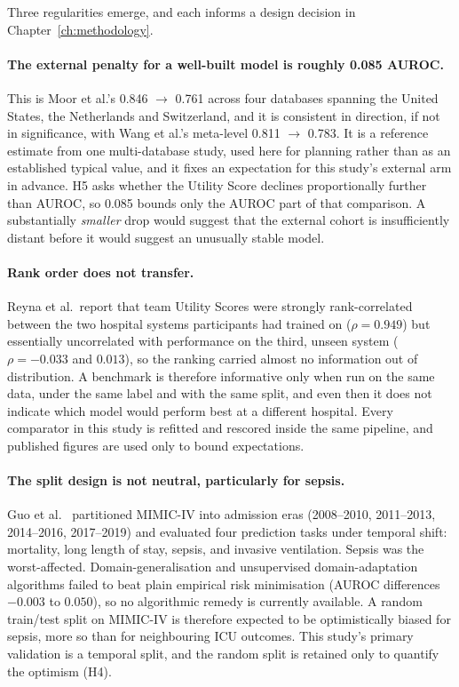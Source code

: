 Three regularities emerge, and each informs a design decision in
Chapter~\ref{ch:methodology}.

\paragraph{The external penalty for a well-built model is roughly 0.085 AUROC.}
This is Moor et al.'s 0.846 $\rightarrow$ 0.761 across four databases spanning
the United States, the Netherlands and Switzerland, and it is consistent in
direction, if not in significance, with Wang et al.'s meta-level 0.811
$\rightarrow$ 0.783. It is a reference estimate from one multi-database study,
used here for planning rather than as an established typical value, and it
fixes an expectation for this study's external arm in advance. H5 asks whether
the Utility Score declines proportionally further than AUROC, so 0.085 bounds
only the AUROC part of that comparison. A substantially \emph{smaller} drop
would suggest that the external cohort is insufficiently distant before it
would suggest an unusually stable model.

\paragraph{Rank order does not transfer.} Reyna et al.\ report that team
Utility Scores were strongly rank-correlated between the two hospital systems
participants had trained on ($\rho = 0.949$) but essentially uncorrelated with
performance on the third, unseen system ($\rho = -0.033$ and $0.013$), so the
ranking carried almost no information out of distribution. A benchmark is
therefore informative only when run on the same data, under the same label and
with the same split, and even then it does not indicate which model would
perform best at a different hospital. Every comparator in this study is
refitted and rescored inside the same pipeline, and published figures are used
only to bound expectations.

\paragraph{The split design is not neutral, particularly for sepsis.}
Guo et al.\ \cite{guo2022temporal} partitioned MIMIC-IV into admission eras
(2008--2010, 2011--2013, 2014--2016, 2017--2019) and evaluated four prediction
tasks under temporal shift: mortality, long length of stay, sepsis, and
invasive ventilation. Sepsis was the worst-affected. Domain-generalisation and
unsupervised domain-adaptation algorithms failed to beat plain empirical risk
minimisation (AUROC differences $-0.003$ to $0.050$), so no algorithmic remedy
is currently available. A random train/test split on MIMIC-IV is therefore
expected to be optimistically biased for sepsis, more so than for neighbouring
ICU outcomes. This study's primary validation is a temporal split, and the
random split is retained only to quantify the optimism (H4).


